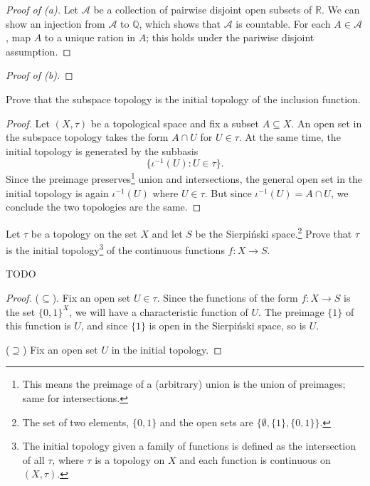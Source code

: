 \documentclass[../../main.tex]{subfiles}
\begin{document}
\begin{proof}[Proof of (a)]
    Let $\mathscr{A}$ be a collection of pairwise disjoint open subsets of $\mathbb{R}$.
    We can show an injection from $\mathscr{A}$ to $\mathbb{Q}$, which shows that $\mathscr{A}$ is countable.
    For each $A \in \mathscr{A}$, map $A$ to a unique ration in $A$; this holds under the pariwise disjoint assumption.
\end{proof}

\begin{proof}[Proof of (b)]

\end{proof}


\begin{problem}[6]
    Prove that the subspace topology is the initial topology of the inclusion function.
\end{problem}
\begin{proof}
    Let $(X, \tau)$ be a topological space and fix a subset $A \subseteq X$.
    An open set in the subspace topology takes the form $A \cap U$ for $U \in \tau$.
    At the same time, the initial topology is generated by the subbasis
    \[
        \{ \iota^{-1}(U) : U \in \tau \}.
    \]
    Since the preimage preserves\footnote{This means the preimage of a (arbitrary) union is the union of preimages; same for intersections.} union and intersections, the general open set in the initial topology is again $\iota^{-1}(U)$ where $U \in \tau$.
    But since $\iota^{-1}(U) = A \cap U$, we conclude the two topologies are the same.
\end{proof}

\begin{problem}[7]
Let $\tau$ be a topology on the set $X$ and let $S$ be the Sierpi\'nski space.\footnote{
	The set of two elements, $\{0, 1\}$ and the open sets are $\{ \emptyset, \{1\}, \{0, 1\} \}$.}
Prove that $\tau$ is the initial topology\footnote{The initial topology given a family of functions is defined as the intersection of all $\tau$, where $\tau$ is a topology on $X$ and each function is continuous on $(X, \tau)$.}
of the continuous functions $f : X \to S$.
\end{problem}
{\huge TODO}
\begin{proof}
	($\subseteq$). Fix an open set $U \in \tau$.
	Since the functions of the form $f : X \to S$ is the set $\{0, 1\}^X$, we will have a characteristic function of $U$.
	The preimage $\{1\}$ of this function is $U$, and since $\{1\}$ is open in the Sierpi\'nski space, so is $U$.

	($\supseteq$) Fix an open set $U$ in the initial topology.
\end{proof}
\end{document}
